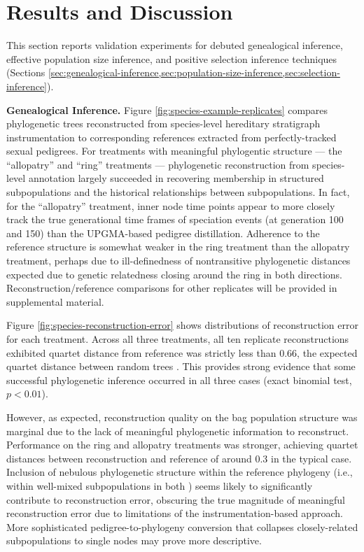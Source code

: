 \section{Results and Discussion} \label{sec:results}

This section reports validation experiments for debuted genealogical inference, effective population size inference, and positive selection inference techniques (Sections \ref{sec:genealogical-inference,sec:population-size-inference,sec:selection-inference}).


\textbf{Genealogical Inference.}
Figure \ref{fig:species-example-replicates} compares phylogenetic trees reconstructed from species-level hereditary stratigraph instrumentation to corresponding references extracted from perfectly-tracked sexual pedigrees.
For treatments with meaningful phylogentic structure --- the ``allopatry'' and ``ring'' treatments --- phylogenetic reconstruction from species-level annotation largely succeeded in recovering membership in structured subpopulations and the historical relationships between subpopulations.
In fact, for the ``allopatry'' treatment, inner node time points appear to more closely track the true generational time frames of speciation events (at generation 100 and 150) than the UPGMA-based pedigree distillation.
Adherence to the reference structure is somewhat weaker in the ring treatment than the allopatry treatment, perhaps due to ill-definedness of nontransitive phylogenetic distances expected due to genetic relatedness closing around the ring in both directions.
Reconstruction/reference comparisons for other replicates will be provided in supplemental material.



Figure \ref{fig:species-reconstruction-error} shows distributions of reconstruction error for each treatment.
Across all three treatments, all ten replicate reconstructions exhibited quartet distance from reference was strictly less than 0.66, the expected quartet distance between random trees \citep{smith2020information}.
This provides strong evidence that some successful phylogenetic inference occurred in all three cases (exact binomial test, $p < 0.01$).

However, as expected, reconstruction quality on the bag population structure was marginal due to the lack of meaningful phylogenetic information to reconstruct.
Performance on the ring and allopatry treatments was stronger, achieving quartet distances between reconstruction and reference of around 0.3 in the typical case.
Inclusion of nebulous phylogenetic structure within the reference phylogeny (i.e., within well-mixed subpopulations in both ) seems likely to significantly contribute to reconstruction error, obscuring the true magnitude of meaningful reconstruction error due to limitations of the instrumentation-based approach.
More sophisticated pedigree-to-phylogeny conversion that collapses closely-related subpopulations to single nodes may prove more descriptive.

